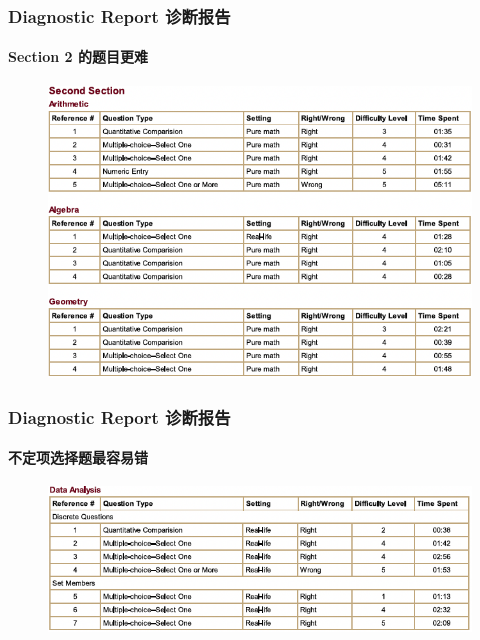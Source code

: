 \documentclass[
	11pt, %
]{beamer}
\begin{document}
\begin{frame}
	\frametitle{Diagnostic Report 诊断报告}
	\framesubtitle{Section 2 的题目更难}
	
	\begin{figure}
		\includegraphics[width=0.9\linewidth]{Diagnostic_Report_Section2_1.png}
	\end{figure}
\end{frame}


\begin{frame}
	\frametitle{Diagnostic Report 诊断报告}
	\framesubtitle{不定项选择题最容易错}
	
	\begin{figure}
		\includegraphics[width=0.9\linewidth]{Diagnostic_Report_Section2_2.png}
	\end{figure}
\end{frame}

\end{document}
